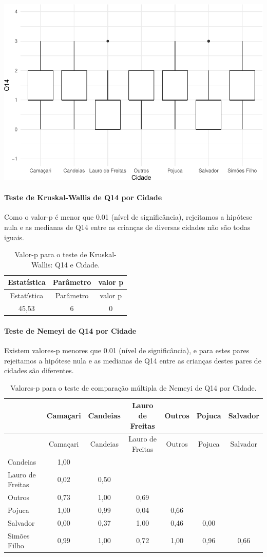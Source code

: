 \documentclass[]{article}
\let\oldparagraph\paragraph
\renewcommand{\paragraph}[1]{\oldparagraph{#1}\mbox{}}
\begin{document}
\begin{center}\includegraphics[width=0.75\linewidth]{relatorio_covid19_files/figure-latex/unnamed-chunk-18-1} \end{center}

\hypertarget{teste-de-kruskal-wallis-de-q14-por-cidade}{%
\paragraph{Teste de Kruskal-Wallis de Q14 por Cidade}\label{teste-de-kruskal-wallis-de-q14-por-cidade}}

Como o valor-p é menor que 0.01 (nível de significância), rejeitamos a hipótese nula e as medianas de Q14 entre as crianças de diversas cidades não são todas iguais.

\begin{longtable}[]{@{}ccc@{}}
\caption{\label{tab:unnamed-chunk-20}Valor-p para o teste de Kruskal-Wallis: Q14 e Cidade.}\tabularnewline
\toprule
Estatística & Parâmetro & valor p\tabularnewline
\midrule
\endfirsthead
\toprule
Estatística & Parâmetro & valor p\tabularnewline
\midrule
\endhead
45,53 & 6 & 0\tabularnewline
\bottomrule
\end{longtable}

\hypertarget{teste-de-nemeyi-de-q14-por-cidade}{%
\paragraph{Teste de Nemeyi de Q14 por Cidade}\label{teste-de-nemeyi-de-q14-por-cidade}}

Existem valores-p menores que 0.01 (nível de significância), e para estes pares rejeitamos a hipótese nula e as medianas de Q14 entre as crianças destes pares de cidades são diferentes.

\begin{longtable}[]{@{}lcccccc@{}}
\caption{\label{tab:unnamed-chunk-22}Valores-p para o teste de comparação múltipla de Nemeyi de Q14 por Cidade.}\tabularnewline
\toprule
& Camaçari & Candeias & Lauro de Freitas & Outros & Pojuca & Salvador\tabularnewline
\midrule
\endfirsthead
\toprule
& Camaçari & Candeias & Lauro de Freitas & Outros & Pojuca & Salvador\tabularnewline
\midrule
\endhead
Candeias & 1,00 & & & & &\tabularnewline
Lauro de Freitas & 0,02 & 0,50 & & & &\tabularnewline
Outros & 0,73 & 1,00 & 0,69 & & &\tabularnewline
Pojuca & 1,00 & 0,99 & 0,04 & 0,66 & &\tabularnewline
Salvador & 0,00 & 0,37 & 1,00 & 0,46 & 0,00 &\tabularnewline
Simões Filho & 0,99 & 1,00 & 0,72 & 1,00 & 0,96 & 0,66\tabularnewline
\bottomrule
\end{longtable}
\end{document}
